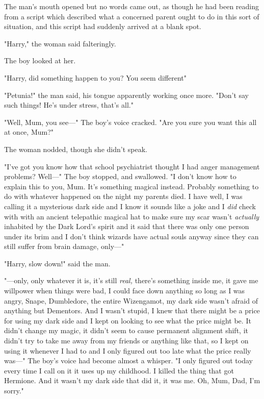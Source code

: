 The man's mouth opened but no words came out, as though he had been reading
from a script which described what a concerned parent ought to do in this sort
of situation, and this script had suddenly arrived at a blank spot.

"Harry," the woman said falteringly.

The boy looked at her.

"Harry, did something happen to you? You seem{\el} different{\el}"

"Petunia!" the man said, his tongue apparently working once more. "Don't say
such things! He's under stress, that's all."

"Well, Mum, you see\mbox{---}" The boy's voice cracked. "Are you sure you want this
all at once, Mum?"

The woman nodded, though she didn't speak.

"I've got{\el} you know how that school psychiatrist thought I had anger
management problems? Well\mbox{---}" The boy stopped, and swallowed. "I don't know how
to explain this to you, Mum. It's something magical instead. Probably something
to do with whatever happened on the night my parents died. I have{\el} well,
I was calling it a mysterious dark side and I know it sounds like a joke and I
\emph{did} check with{\el} with an ancient telepathic magical hat to make
sure my scar wasn't \emph{actually} inhabited by the Dark Lord's spirit and it
said that there was only one person under its brim and I don't think wizards
have actual souls anyway since they can still suffer from brain damage, only\mbox{---}"

"Harry, slow down!" said the man.

"---only, only whatever it is, it's still \emph{real,} there's something inside
me, it gave me willpower when things were bad, I could face down anything so
long as I was angry, Snape, Dumbledore, the entire Wizengamot, my dark side
wasn't afraid of anything but Dementors. And I wasn't stupid, I knew that there
might be a price for using my dark side and I kept on looking to see what the
price might be. It didn't change my magic, it didn't seem to cause permanent
alignment shift, it didn't try to take me away from my friends or anything like
that, so I kept on using it whenever I had to and I only figured out too late
what the price really was\mbox{---}" The boy's voice had become almost a whisper. "I
only figured out today{\el} every time I call on it{\el} it uses up my
childhood. I killed the thing that got Hermione. And it wasn't my dark side
that did it, it was me. Oh, Mum, Dad, I'm sorry."

